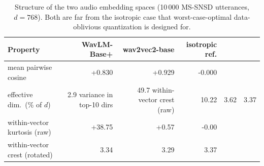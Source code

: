 \begin{table}[t]
\centering
\caption{Structure of the two audio embedding spaces (10\,000 MS-SNSD utterances, $d=768$). Both are far from the isotropic case that worst-case-optimal data-oblivious quantization is designed for.}
\label{tab:structure}
\begin{tabular}{lrrr}
\toprule
Property & WavLM-Base+ & wav2vec2-base & isotropic ref. \\
\midrule
mean pairwise cosine & +0.830 & +0.929 & -0.000 \\
effective dim.\ (\% of $d$) & 2.9%
variance in top-10 dirs & 49.7%
within-vector crest (raw) & 10.22 & 3.62 & 3.37 \\
within-vector kurtosis (raw) & +38.75 & +0.57 & -0.00 \\
\midrule
within-vector crest (rotated) & 3.34 & 3.29 & 3.37 \\
\bottomrule
\end{tabular}
\end{table}